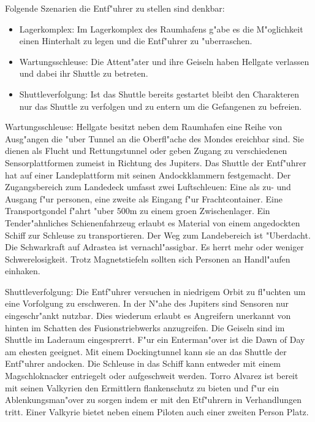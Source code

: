 Folgende Szenarien die Entf"uhrer zu stellen sind denkbar:

\begin{itemize}
	\item Lagerkomplex: Im Lagerkomplex des Raumhafens g"abe es die M"oglichkeit einen Hinterhalt zu legen und die Entf"uhrer zu "uberraschen.
	\item Wartungsschleuse: Die Attent"ater und ihre Geiseln haben Hellgate verlassen und dabei ihr Shuttle zu betreten.
	\item Shuttleverfolgung: Ist das Shuttle bereits gestartet bleibt den Charakteren nur das Shuttle zu verfolgen und zu entern um die Gefangenen zu befreien.
\end{itemize}


Wartungsschleuse: Hellgate besitzt neben dem Raumhafen eine Reihe von Ausg"angen die "uber Tunnel an die Oberfl"ache des Mondes ereichbar sind. Sie dienen als Flucht und Rettungstunnel oder geben Zugang zu verschiedenen Sensorplattformen zumeist in Richtung des Jupiters. Das Shuttle der Entf"uhrer hat auf einer Landeplattform mit seinen Andockklammern festgemacht. Der Zugangsbereich zum Landedeck umfasst zwei Luftschleu\3en: Eine als zu- und Ausgang f"ur personen, eine zweite als Eingang f"ur Frachtcontainer. Eine Transportgondel f"ahrt "uber 500m zu einem gro\3en Zwischenlager. Ein Tender"ahnliches Schienenfahrzeug erlaubt es Material von einem angedockten Schiff zur Schleuse zu transportieren. Der Weg zum Landebereich ist "Uberdacht.  Die Schwarkraft auf Adrastea ist vernachl"assigbar. Es herrt mehr oder weniger Schwerelosigkeit. Trotz Magnetstiefeln sollten sich Personen an Handl"aufen einhaken.

Shuttleverfolgung: Die Entf"uhrer versuchen in niedrigem Orbit zu fl"uchten um eine Vorfolgung zu erschweren. In der N"ahe des Jupiters sind Sensoren nur eingeschr"ankt nutzbar. Dies wiederum erlaubt es Angreifern unerkannt von hinten im Schatten des Fusionstriebwerks anzugreifen. Die Geiseln sind im Shuttle im Laderaum eingesprerrt. F"ur ein Enterman"over ist die Dawn of Day am ehesten geeignet. Mit einem Dockingtunnel kann sie an das Shuttle der Entf"uhrer andocken. Die Schleuse in das Schiff kann entweder mit einem Magschlo\3knacker entriegelt oder aufgeschwei\3t werden. Torro Alvarez ist bereit mit seinen Valkyrien den Ermittlern flankenschutz zu bieten und f"ur ein Ablenkungsman"over zu sorgen indem er mit den Etf"uhrern in Verhandlungen tritt. Einer Valkyrie bietet neben einem Piloten auch einer zweiten Person Platz.


